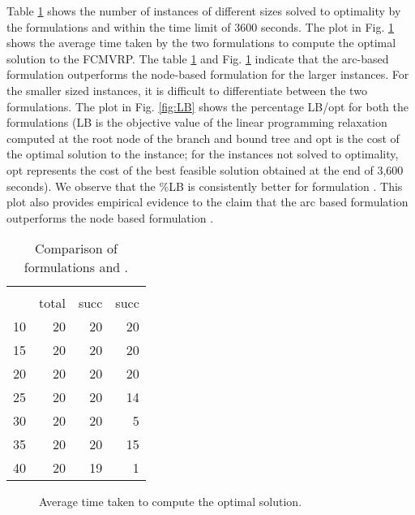 \documentclass[letterpaper, 10pt, conference]{ieeeconf}
\begin{document}
Table \ref{tab:2} shows the number of instances of different sizes solved to optimality by the formulations  and  within the time limit of 3600 seconds. The plot in Fig. \ref{fig:times} shows the average time taken by the two formulations to compute the optimal solution to the FCMVRP. The table \ref{tab:2} and Fig. \ref{fig:times} indicate that the arc-based formulation  outperforms the node-based formulation  for the larger instances. For the smaller sized instances, it is difficult to differentiate between the two formulations. The plot in Fig. \ref{fig:LB} shows the percentage LB/opt for both the formulations (LB is the objective value of the linear programming relaxation computed at the root node of the branch and bound tree and opt is the cost of the optimal solution to the instance; for the instances not solved to optimality, opt represents the cost of the best feasible solution obtained at the end of 3,600 seconds). We observe that the \%LB is consistently better for formulation . This plot also provides empirical evidence to the claim that the arc based formulation  outperforms the node based formulation . 

\begin{table}
\centering
\caption{Comparison of formulations  and .}
\label{tab:2}
\begin{tabular}{lrrr} 
\toprule 
 & &  &  \\
 \cline{3-4}
  & total & succ & succ \\
\midrule 
10 & 20 & 20 & 20\\
15 & 20 & 20 & 20\\
20 & 20 & 20 & 20\\
25 & 20 & 20 & 14\\ 
30 & 20 & 20 & 5\\
35 & 20 & 20 & 15\\ 
40 & 20 & 19 & 1\\
\bottomrule 
\end{tabular} 
\end{table}

\begin{figure}
\caption{Average time taken to compute the optimal solution.}
\label{fig:times}
\end{figure}
\end{document}
